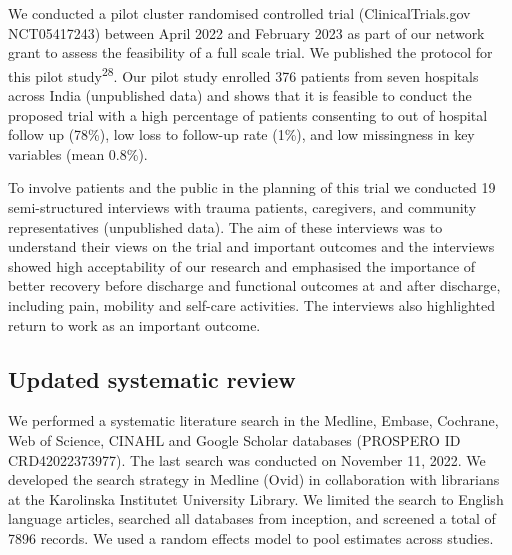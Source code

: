\documentclass[
]{scrartcl}
\begin{document}
We conducted a pilot cluster randomised controlled trial
(ClinicalTrials.gov NCT05417243) between April 2022 and February 2023 as
part of our network grant to assess the feasibility of a full scale
trial. We published the protocol for this pilot
study\textsuperscript{28}. Our pilot study enrolled 376 patients from
seven hospitals across India (unpublished data) and shows that it is
feasible to conduct the proposed trial with a high percentage of
patients consenting to out of hospital follow up (78\%), low loss to
follow-up rate (1\%), and low missingness in key variables (mean 0.8\%).

To involve patients and the public in the planning of this trial we
conducted 19 semi-structured interviews with trauma patients,
caregivers, and community representatives (unpublished data). The aim of
these interviews was to understand their views on the trial and
important outcomes and the interviews showed high acceptability of our
research and emphasised the importance of better recovery before
discharge and functional outcomes at and after discharge, including
pain, mobility and self-care activities. The interviews also highlighted
return to work as an important outcome.

\hypertarget{updated-systematic-review}{%
\subsection{Updated systematic review}\label{updated-systematic-review}}

We performed a systematic literature search in the Medline, Embase,
Cochrane, Web of Science, CINAHL and Google Scholar databases (PROSPERO
ID CRD42022373977). The last search was conducted on November 11, 2022.
We developed the search strategy in Medline (Ovid) in collaboration with
librarians at the Karolinska Institutet University Library. We limited
the search to English language articles, searched all databases from
inception, and screened a total of 7896 records. We used a random
effects model to pool estimates across studies.
\end{document}
